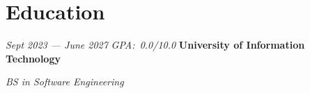 \section{Education}

\begin{twocolentry}{
		\textit{Sept 2023 --- June 2027}
		\textit{GPA:\ 0.0/10.0}
	}
	\textbf{University of Information Technology}

	\textit{BS in Software Engineering}
\end{twocolentry}
